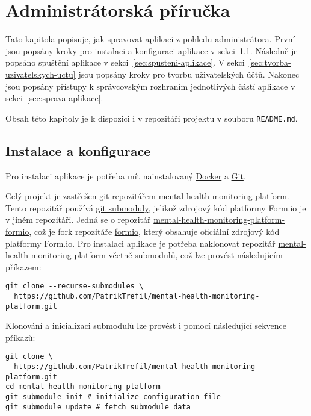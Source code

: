 \chapter{Administrátorská příručka}\label{ch:administratorska-prirucka}

Tato kapitola popisuje, jak spravovat aplikaci z pohledu administrátora.
První jsou popsány kroky pro instalaci a konfiguraci aplikace v sekci~\ref{sec:instalace}.
Následně je popsáno spuštění aplikace v sekci~\ref{sec:spusteni-aplikace}.
V sekci~\ref{sec:tvorba-uzivatelskych-uctu} jsou popsány kroky pro tvorbu uživatelských účtů.
Nakonec jsou popsány přístupy k správcovským rozhraním jednotlivých částí aplikace v sekci~\ref{sec:sprava-aplikace}.

Obsah této kapitoly je k dispozici i v repozitáři projektu v souboru \texttt{README.md}.

\section{Instalace a konfigurace}\label{sec:instalace}

Pro instalaci aplikace je potřeba mít nainstalovaný \href{https://www.docker.com/}{Docker} a \href{https://git-scm.com/}{Git}.

Celý projekt je zastřešen git repozitářem \href{https://github.com/PatrikTrefil/mental-health-monitoring-platform.git}{mental-health-monitoring-platform}.
Tento repozitář používá \href{https://git-scm.com/book/en/v2/Git-Tools-Submodules}{git submoduly}, jelikož zdrojový kód platformy Form.io je v jiném repozitáři.
Jedná se o repozitář \href{https://github.com/PatrikTrefil/mental-health-monitoring-platform-formio}{mental-health-monitoring-platform-formio}, což je fork repozitáře \href{https://github.com/formio/formio}{formio}, který obsahuje oficiální zdrojový kód platformy Form.io.
Pro instalaci aplikace je potřeba naklonovat repozitář \href{https://github.com/PatrikTrefil/mental-health-monitoring-platform.git}{mental-health-monitoring-platform} včetně submodulů, což lze provést následujícím příkazem:

\begin{verbatim}
git clone --recurse-submodules \
  https://github.com/PatrikTrefil/mental-health-monitoring-platform.git
\end{verbatim}

Klonování a inicializaci submodulů lze provést i pomocí následující sekvence příkazů:

\begin{verbatim}
git clone \
  https://github.com/PatrikTrefil/mental-health-monitoring-platform.git
cd mental-health-monitoring-platform
git submodule init # initialize configuration file
git submodule update # fetch submodule data
\end{verbatim}

